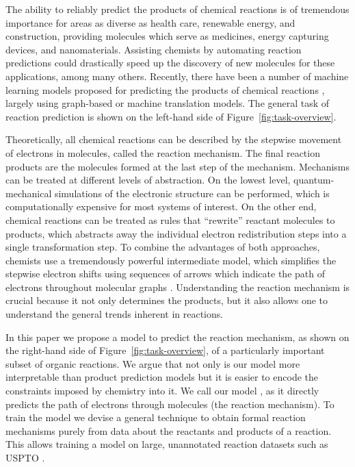 
The ability to reliably predict the products of chemical reactions is of tremendous importance for areas as diverse as health care, renewable energy, and construction, providing molecules which serve as medicines, energy capturing devices, and nanomaterials. 
Assisting chemists by automating reaction predictions could drastically speed up the discovery of new molecules for these applications, among many others. Recently, there have been a number of machine learning models proposed for predicting the products of chemical reactions \cite{coley2017prediction,jin2017predicting,schwaller2017found,neural-symbolic,segler2018planning,wei2016neural}, largely using graph-based or machine translation models. The general task of reaction prediction is shown on the left-hand side of Figure~\ref{fig:task-overview}.

Theoretically, all chemical reactions can be described by the stepwise movement of electrons in molecules, called the reaction mechanism. The final reaction products are the molecules formed at the last step of the mechanism. 
Mechanisms can be treated at different levels of abstraction. On the lowest level, quantum-mechanical simulations of the electronic structure can be performed, which is computationally expensive for most systems of interest. 
On the other end, chemical reactions can be treated as rules that ``rewrite'' reactant molecules to products, which abstracts away the individual electron redistribution steps into a single transformation step. 
To combine the advantages of both approaches, chemists use a tremendously powerful intermediate model, which simplifies the stepwise electron shifts using sequences of arrows which indicate the path of electrons throughout molecular graphs \cite{herges1994organizing}. 
Understanding the reaction mechanism is crucial because it not only determines the products, but it also allows one to understand the general trends inherent in reactions. %


In this paper we propose a model to predict the reaction mechanism, as shown on the right-hand side of Figure~\ref{fig:task-overview}, of a particularly important subset of organic reactions.
We argue that not only is our model more interpretable than product prediction models but it is easier to encode the constraints imposed by chemistry into it. 
We call our model \ourModel, as it directly predicts the path of electrons through molecules (the reaction mechanism). To train the model we devise a general technique to obtain formal reaction mechanisms purely from data about the reactants and products of a reaction. This allows training a model on large, unannotated reaction datasets such as USPTO \cite{lowe2012extraction}. 



